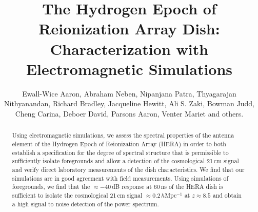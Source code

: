 \documentclass[preprint]{emulateapj}
\begin{document}
\title{The Hydrogen Epoch of Reionization Array Dish: Characterization with Electromagnetic Simulations}
\author{
Ewall-Wice Aaron,
Abraham Neben,
Nipanjana Patra,
Thyagarajan Nithyanandan,
Richard Bradley,
Jacqueline Hewitt,
Ali S. Zaki,
Bowman Judd,
Cheng Carina,
Deboer David,
Parsons Aaron,
Venter Mariet
and others.
}

\begin{abstract}
Using electromagnetic simulations, we assess the spectral properties of the antenna element of the Hydrogen Epoch of Reionization Array (HERA) in order to both establish a specification for the degree of spectral structure that is permissible to sufficiently isolate foregrounds and allow a detection of the cosmological 21\,cm signal and verify direct laboratory measurements of the dish characteristics. We find that our simulations are in good agreement with field measurements. Using simulations of foregrounds, we find that the $\approx -40$\,dB response at 60\,ns of the HERA dish is sufficient to isolate the cosmological 21\,cm signal $\approx 0.2$\,$h$Mpc$^{-1}$ at $z\approx 8.5$ and obtain a high signal to noise detection of the power spectrum.
\end{abstract}
\end{document}
